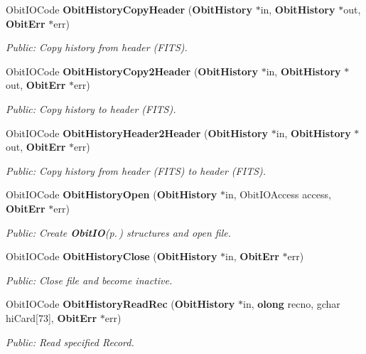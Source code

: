 \begin{CompactItemize}
Obit\-IOCode {\bf Obit\-History\-Copy\-Header} ({\bf Obit\-History} $\ast$in, {\bf Obit\-History} $\ast$out, {\bf Obit\-Err} $\ast$err)
\begin{CompactList}\small\item\em Public: Copy history from header (FITS). \item\end{CompactList}\item 
Obit\-IOCode {\bf Obit\-History\-Copy2Header} ({\bf Obit\-History} $\ast$in, {\bf Obit\-History} $\ast$out, {\bf Obit\-Err} $\ast$err)
\begin{CompactList}\small\item\em Public: Copy history to header (FITS). \item\end{CompactList}\item 
Obit\-IOCode {\bf Obit\-History\-Header2Header} ({\bf Obit\-History} $\ast$in, {\bf Obit\-History} $\ast$out, {\bf Obit\-Err} $\ast$err)
\begin{CompactList}\small\item\em Public: Copy history from header (FITS) to header (FITS). \item\end{CompactList}\item 
Obit\-IOCode {\bf Obit\-History\-Open} ({\bf Obit\-History} $\ast$in, Obit\-IOAccess access, {\bf Obit\-Err} $\ast$err)
\begin{CompactList}\small\item\em Public: Create {\bf Obit\-IO}{\rm (p.\,\pageref{structObitIO})} structures and open file. \item\end{CompactList}\item 
Obit\-IOCode {\bf Obit\-History\-Close} ({\bf Obit\-History} $\ast$in, {\bf Obit\-Err} $\ast$err)
\begin{CompactList}\small\item\em Public: Close file and become inactive. \item\end{CompactList}\item 
Obit\-IOCode {\bf Obit\-History\-Read\-Rec} ({\bf Obit\-History} $\ast$in, {\bf olong} recno, gchar hi\-Card[73], {\bf Obit\-Err} $\ast$err)
\begin{CompactList}\small\item\em Public: Read specified Record. \item\end{CompactList}\item 

\end{CompactItemize}
